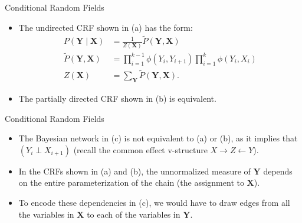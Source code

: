\documentclass[11pt]{beamer}
\begin{document}
\begin{frame}{Conditional Random Fields}
\vspace{0.35cm}
\setlength{\topsep}{0pt}
\setlength{\partopsep}{0pt}
\begin{figure}[!t]
\resizebox{0.85\textwidth}{!}{\linearchain}
\end{figure}
\vspace{0.35cm}
\begin{itemize}
	\item The undirected CRF shown in (a) has the form:
	\begin{align*}
	P(\boldsymbol{Y} \;|\; \boldsymbol{X}) &= \frac{1}{Z(\boldsymbol{X})}
	\tilde{P}(\boldsymbol{Y},\boldsymbol{X}) \\
	\tilde{P}(\boldsymbol{Y},\boldsymbol{X}) &=
	\prod_{i=1}^{k-1} \phi(Y_{i},Y_{i+1}) \prod_{i=1}^{k} \phi(Y_{i},X_{i})
	\\
	Z(\boldsymbol{X}) &= \sum_{\boldsymbol{Y}} \tilde{P}(\boldsymbol{Y},
	\boldsymbol{X}).
	\end{align*}
	\item The partially directed CRF shown in (b) is equivalent.
\end{itemize}
\end{frame}

\begin{frame}{Conditional Random Fields}
\vspace{0.35cm}
\setlength{\topsep}{0pt}
\setlength{\partopsep}{0pt}
\begin{figure}[!t]
\resizebox{0.85\textwidth}{!}{\linearchain}
\end{figure}
\vspace{0.35cm}
\begin{itemize}
	\item The Bayesian network in (c) is not equivalent to (a) or (b), as it
	implies that $(Y_{i} \perp X_{i+1})$ (recall the common effect
	v-structure $X \rightarrow Z \leftarrow Y$).
	\item In the CRFs shown in (a) and (b), the unnormalized measure of
	$\boldsymbol{Y}$ depends on the entire parameterization of the chain
	(the assignment to $\boldsymbol{X}$).
	\item To encode these dependencies in (c), we would have to draw edges
	from all the variables in $\boldsymbol{X}$ to each of the variables in
	$\boldsymbol{Y}$.
\end{itemize}
\end{frame}
\end{document}
